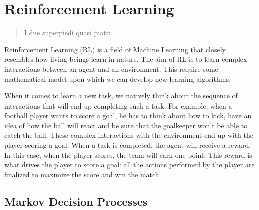 \chapter{Reinforcement Learning}
\label{ch:rl}
\thispagestyle{empty}

\begin{quotation}
{\footnotesize
{}
\begin{flushright}
I due superpiedi quasi piatti
\end{flushright}
}
\end{quotation}
\vspace{0.5cm}


Reinforcement Learning (RL) is a field of Machine Learning that closely resembles how living beings learn in nature. The aim of RL is to learn complex interactions between an agent and an environment. This require some mathematical model upon which we can develop new learning algorithms.

When it comes to learn a new task, we natively think about the sequence of interactions that will end up completing such a task. For example, when a football player wants to score a goal, he has to think about how to kick, have an idea of how the ball will react and be sure that the goalkeeper won't be able to catch the ball. These complex interactions with the environment end up with the player scoring a goal. When a task is completed, the agent will receive a reward. In this case, when the player scores, the team will earn one point. This reward is what drives the player to score a goal: all the actions performed by the player are finalized to maximize the score and win the match. 

\section{Markov Decision Processes}

